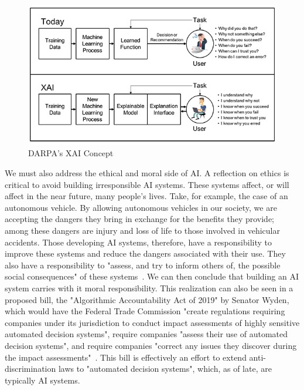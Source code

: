 \documentclass[paper=a4paper]{report}
\begin{document}
\begin{figure}[h]
    \centering
    \includegraphics[scale=1.1]{figures/xai-figure2.png}
    \caption[]{DARPA's XAI Concept~\protect\cite{gunningXAIProgram}}
    \label{fig:darpa_xai}
\end{figure}

We must also address the ethical and moral side of AI. A reflection on ethics is critical to avoid
building irresponsible AI systems. These systems affect, or will affect in the near future, many
people's lives. Take, for example, the case of an autonomous vehicle. By allowing autonomous
vehicles in our society, we are accepting the dangers they bring in exchange for the benefits they
provide; among these dangers are injury and loss of life to those involved in vehicular accidents.
Those developing AI systems, therefore, have a responsibility to improve these systems and reduce
the dangers associated with their use. They also have a responsibility to "assess, and try to inform
others of, the possible social consequences" of these systems~\cite{patrick2017robot}. We can then
conclude that building an AI system carries with it moral responsibility. This realization can also
be seen in a proposed bill, the "Algorithmic Accountability Act of 2019" by Senator Wyden, which
would have the Federal Trade Commission "create regulations requiring companies under its
jurisdiction to conduct impact assessments of highly sensitive automated decision systems", require
companies "assess their use of automated decision systems", and require companies "correct any
issues they discover during the impact assessments"~\cite{wyden2019bill}. This bill is effectively
an effort to extend anti-discrimination laws to "automated decision systems", which, as of late, are
typically AI systems.
\end{document}
